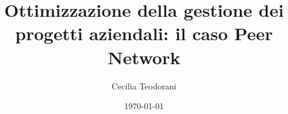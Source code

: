 \documentclass[12pt,a4paper,openright,twoside]{book}
\title{Ottimizzazione della gestione dei progetti aziendali: il caso Peer Network}
\author{Cecilia Teodorani}
\date{\today}
\begin{document}
\frontmatter\frontispiece




\tableofcontents   


\listoffigures 

\mainmatter















\backmatter

\nocite{*} %




\end{document}
